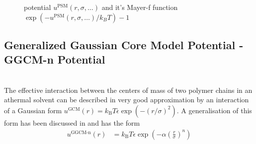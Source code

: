 \begin{figure}[htb]
\centering
  \quad
  \caption{potential $u^\text{PSM}(r,\sigma,\ldots)$ and it's Mayer-f function $\exp(-u^\text{PSM}(r,\sigma,\ldots)/k_BT)-1$}
\end{figure}

\newpage
\subsection{Generalized Gaussian Core Model Potential - GGCM-n Potential}
~\\

The effective interaction between the centers of mass of two polymer chains
in an athermal solvent can be described in very good approximation
by an interaction of a Gaussian form
$u^\text{GCM}(r)= k_\text{B} T \epsilon \exp\left(-\left(r/\sigma\right)^2\right)$.
A generalisation of this form has been discussed in \cite{Mladek2005,Louis2000} and
has the form
\begin{align}
u^\text{GGCM-n}(r)&=
k_\text{B} T \epsilon \exp\left(-\alpha\left(\frac{r}{\sigma}\right)^n\right)
\end{align}


